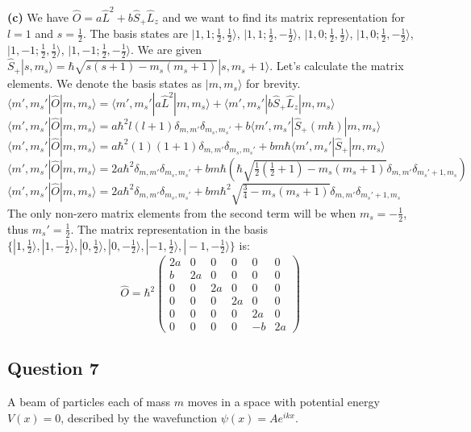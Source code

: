 \documentclass{article}
\begin{document}
\textbf{(c)} We have $\hat{O} = a \hat{L}^2 + b \hat{S}_+ \hat{L}_z$ and we want to find its matrix representation for $l=1$ and $s=\frac{1}{2}$. The basis states are $|1, 1; \frac{1}{2}, \frac{1}{2}\rangle$, $|1, 1; \frac{1}{2}, -\frac{1}{2}\rangle$, $|1, 0; \frac{1}{2}, \frac{1}{2}\rangle$, $|1, 0; \frac{1}{2}, -\frac{1}{2}\rangle$, $|1, -1; \frac{1}{2}, \frac{1}{2}\rangle$, $|1, -1; \frac{1}{2}, -\frac{1}{2}\rangle$.
We are given $\hat{S}_+ |s, m_s\rangle = \hbar \sqrt{s(s+1) - m_s(m_s + 1)} |s, m_s + 1\rangle$.
Let's calculate the matrix elements. We denote the basis states as $|m, m_s\rangle$ for brevity.
$\langle m', m_s' | \hat{O} | m, m_s \rangle = \langle m', m_s' | a \hat{L}^2 | m, m_s \rangle + \langle m', m_s' | b \hat{S}_+ \hat{L}_z | m, m_s \rangle$
$\langle m', m_s' | \hat{O} | m, m_s \rangle = a \hbar^2 l(l+1) \delta_{m,m'} \delta_{m_s, m_s'} + b \langle m', m_s' | \hat{S}_+ (m \hbar) | m, m_s \rangle$
$\langle m', m_s' | \hat{O} | m, m_s \rangle = a \hbar^2 (1)(1+1) \delta_{m,m'} \delta_{m_s, m_s'} + b m \hbar \langle m', m_s' | \hat{S}_+ | m, m_s \rangle$
$\langle m', m_s' | \hat{O} | m, m_s \rangle = 2a \hbar^2 \delta_{m,m'} \delta_{m_s, m_s'} + b m \hbar \left( \hbar \sqrt{\frac{1}{2}(\frac{1}{2}+1) - m_s(m_s + 1)} \delta_{m, m'} \delta_{m_s'+1, m_s} \right)$
$\langle m', m_s' | \hat{O} | m, m_s \rangle = 2a \hbar^2 \delta_{m,m'} \delta_{m_s, m_s'} + b m \hbar^2 \sqrt{\frac{3}{4} - m_s(m_s + 1)} \delta_{m, m'} \delta_{m_s'+1, m_s}$
The only non-zero matrix elements from the second term will be when $m_s = -\frac{1}{2}$, thus $m_s' = \frac{1}{2}$.
The matrix representation in the basis $\{ |1,\frac{1}{2}\rangle, |1, -\frac{1}{2}\rangle, |0, \frac{1}{2}\rangle, |0, -\frac{1}{2}\rangle, |-1, \frac{1}{2}\rangle, |-1, -\frac{1}{2}\rangle \}$ is:
\[
\hat{O} = \hbar^2 \begin{pmatrix}
2a & 0 & 0 & 0 & 0 & 0 \\
b & 2a & 0 & 0 & 0 & 0 \\
0 & 0 & 2a & 0 & 0 & 0 \\
0 & 0 & 0 & 2a & 0 & 0 \\
0 & 0 & 0 & 0 & 2a & 0 \\
0 & 0 & 0 & 0 & -b & 2a
\end{pmatrix}
\]



\subsection{Question 7}
A beam of particles each of mass $m$ moves in a space with potential energy $V(x) = 0$, described by the wavefunction $\psi(x) = A e^{ikx}$.  
\end{document}

